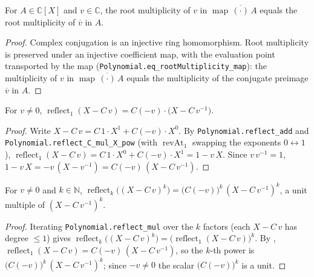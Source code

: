 \begin{lemma}
    \label{lem:rootmult-map-conj}
    \leanok
    For $A \in \mathbb{C}[X]$ and $v \in \mathbb{C}$, the root multiplicity of
    $v$ in $\operatorname{map}\,\overline{(\cdot)}\,A$ equals the root
    multiplicity of $\overline{v}$ in $A$.
\end{lemma}
\begin{proof}
    Complex conjugation is an injective ring homomorphism. Root multiplicity is
    preserved under an injective coefficient map, with the evaluation point
    transported by the map (\texttt{Polynomial.eq\_rootMultiplicity\_map}):
    the multiplicity of $v$ in $\operatorname{map}\,\overline{(\cdot)}\,A$ equals
    the multiplicity of the conjugate preimage $\overline{v}$ in $A$.
\end{proof}

\begin{lemma}
    \label{lem:reflect-linear}
    \leanok
    For $v \neq 0$,
    $\operatorname{reflect}_1(X - C\,v) = C(-v)\cdot\bigl(X - C\,v^{-1}\bigr)$.
\end{lemma}
\begin{proof}
    Write $X - C\,v = C\,1\cdot X^{1} + C(-v)\cdot X^{0}$. By
    \texttt{Polynomial.reflect\_add} and \texttt{Polynomial.reflect\_C\_mul\_X\_pow}
    (with $\operatorname{revAt}_1$ swapping the exponents $0 \leftrightarrow 1$),
    $\operatorname{reflect}_1(X - C\,v) = C\,1\cdot X^{0} + C(-v)\cdot X^{1}
    = 1 - v\,X$. Since $v\,v^{-1} = 1$, $1 - v\,X = -v\,(X - v^{-1})
    = C(-v)\,(X - C\,v^{-1})$.
\end{proof}

\begin{lemma}
    \label{lem:reflect-pow-linear}
    \leanok
    For $v \neq 0$ and $k \in \mathbb{N}$,
    $\operatorname{reflect}_k\bigl((X - C\,v)^{k}\bigr)
    = \bigl(C(-v)\bigr)^{k}\,(X - C\,v^{-1})^{k}$, a unit multiple of
    $(X - C\,v^{-1})^{k}$.
\end{lemma}
\begin{proof}
    Iterating \texttt{Polynomial.reflect\_mul} over the $k$ factors (each
    $X - C\,v$ has degree $\le 1$) gives $\operatorname{reflect}_k\bigl(
    (X - C\,v)^{k}\bigr) = \bigl(\operatorname{reflect}_1(X - C\,v)\bigr)^{k}$.
    By , $\operatorname{reflect}_1(X - C\,v)
    = C(-v)\,(X - C\,v^{-1})$, so the $k$-th power is
    $\bigl(C(-v)\bigr)^{k}\,(X - C\,v^{-1})^{k}$; since $-v \neq 0$ the scalar
    $\bigl(C(-v)\bigr)^{k}$ is a unit.
\end{proof}

